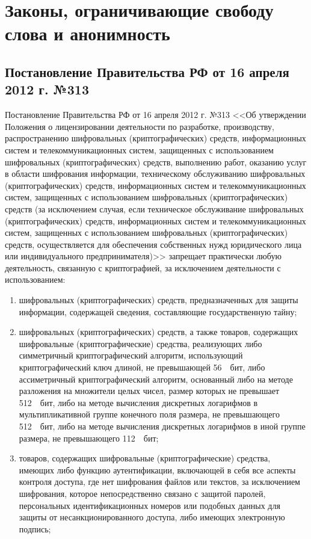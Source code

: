 \chapter{Законы, ограничивающие свободу слова и анонимность}
\section{Постановление Правительства РФ от 16 апреля 2012 г. №313}
{Постановление Правительства РФ от 16 апреля 2012 г. №313 <<Об утверждении Положения о лицензировании деятельности по разработке, производству, распространению шифровальных (криптографических) средств, информационных систем и телекоммуникационных систем, защищенных с использованием шифровальных (криптографических) средств, выполнению работ, оказанию услуг в области шифрования информации, техническому обслуживанию шифровальных (криптографических) средств, информационных систем и телекоммуникационных систем, защищенных с использованием шифровальных (криптографических) средств (за исключением случая, если техническое обслуживание шифровальных (криптографических) средств, информационных систем и телекоммуникационных систем, защищенных с использованием шифровальных (криптографических) средств, осуществляется для обеспечения собственных нужд юридического лица или индивидуального предпринимателя)>> запрещает практически любую деятельность, связанную с криптографией, за исключением деятельности с использованием:
\begin{enumerate}
\item шифровальных (криптографических) средств, предназначенных для защиты информации, содержащей сведения, составляющие государственную тайну;
\item шифровальных (криптографических) средств, а также товаров, содержащих шифровальные (криптографические) средства, реализующих либо симметричный криптографический алгоритм, использующий криптографический ключ длиной, не превышающей 56  бит, либо ассиметричный криптографический алгоритм, основанный либо на методе разложения на множители целых чисел, размер которых не превышает 512  бит, либо на методе вычисления дискретных логарифмов в мультипликативной группе конечного поля размера, не превышающего 512  бит, либо на методе вычисления дискретных логарифмов в иной группе размера, не превышающего 112  бит;
\item товаров, содержащих шифровальные (криптографические) средства, имеющих либо функцию аутентификации, включающей в себя все аспекты контроля доступа, где нет шифрования файлов или текстов, за исключением шифрования, которое непосредственно связано с защитой паролей, персональных идентификационных номеров или подобных данных для защиты от несанкционированного доступа, либо имеющих электронную подпись;

\end{enumerate}}

